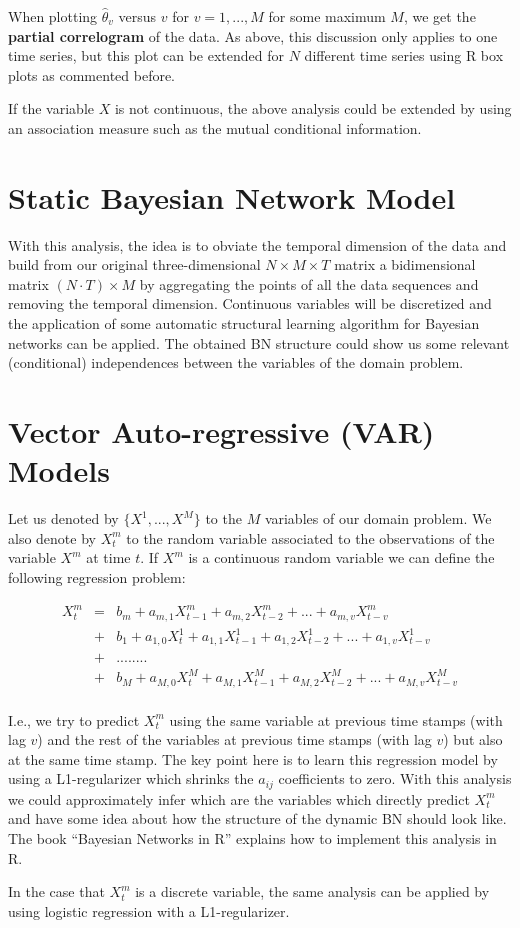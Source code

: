 \documentclass[12pt,a4paper,twopages]{article}
\begin{document}
When plotting $\hat{\theta}_v$  versus $v$ for $v=1,...,M$ for some maximum $M$, we get the \textbf{partial correlogram} of the data. As above, this discussion only applies to one time series, but this plot can be extended for $N$ different time series using R box plots as commented before. 

If the variable $X$ is not continuous, the above analysis could be extended by using an association measure such as the mutual conditional information. 


\section{Static Bayesian Network Model}

With this analysis, the idea is to obviate the temporal dimension of the data and build from our original three-dimensional $N\times M\times T$ matrix a bidimensional matrix $(N\cdot T)\times M$ by aggregating the points of all the data sequences and removing the temporal dimension. Continuous variables will be discretized and the application of some automatic structural learning algorithm for Bayesian networks can be applied. The obtained BN structure could show us some relevant (conditional) independences between the variables of the domain problem. 


\section{Vector Auto-regressive (VAR) Models}

Let us denoted by $\{X^1,...,X^M\}$ to the $M$ variables of our domain problem. We also denote by $X_t^m$ to the random variable associated to the observations of the variable $X^m$ at time $t$. If $X^m$ is a continuous random variable we can define the following regression problem:

\begin{eqnarray}
X^m_t &=&   b_m +  a_{m,1}X^m_{t-1} + a_{m,2}X^m_{t-2} + ... + a_{m,v}X^m_{t-v} \\
           & + &  b_1 + a_{1,0}X^1_t +  a_{1,1}X^1_{t-1} + a_{1,2}X^1_{t-2} + ... + a_{1,v}X^1_{t-v}\\
           & + &    ........ \\ 
           & + &  b_M + a_{M,0}X^M_t +  a_{M,1}X^M_{t-1} + a_{M,2}X^M_{t-2} + ... + a_{M,v}X^M_{t-v}\\
\end{eqnarray}

I.e., we try to predict $X^m_t$ using the same variable at previous time stamps (with lag $v$) and the rest of the variables at previous time stamps (with lag $v$) but also at the same time stamp. 
The key point here is to learn this regression model by using a L1-regularizer which shrinks the $a_{ij}$ coefficients to zero. With this analysis we could approximately infer which are the variables which directly predict $X^m_t$ and have some idea about how the structure of the dynamic BN should look like. The book ``Bayesian Networks in R'' explains how to implement this analysis in R. 

In the case that $X^m_t$ is a discrete variable, the same analysis can be applied by using logistic regression with a L1-regularizer.  
\end{document}
